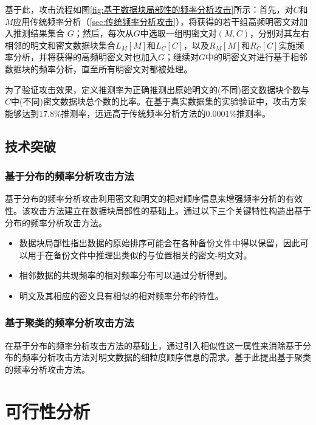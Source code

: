 基于此，攻击流程如图\ref{fig:基于数据块局部性的频率分析攻击}所示：首先，对$C$和$M$应用传统频率分析（\ref{sec:传统频率分析攻击}），将获得的若干组高频明密文对加入推测结果集合 $G$；然后，每次从$G$中选取一组明密文对$(M,C)$，分别对其左右相邻的明文和密文数据块集合$L_M[M]$和$L_C[C]$，以及$R_M[M]$和$R_C[C]$实施频率分析，并将获得的高频明密文对也加入$G$；继续对$G$中的明密文对进行基于相邻数据块的频率分析，直至所有明密文对都被处理。

为了验证攻击效果，定义推测率为正确推测出原始明文的(不同)密文数据块个数与$C$中(不同)密文数据块总个数的比率。在基于真实数据集的实验验证中，攻击方案能够达到17.8\%推测率，远远高于传统频率分析方法的0.0001\%推测率。


\subsection{技术突破}

\subsubsection{基于分布的频率分析攻击方法}


\par 基于分布的频率分析攻击利用密文和明文的相对顺序信息来增强频率分析的有效性。该攻击方法建立在数据块局部性的基础上。通过以下三个关键特性构造出基于分布的频率分析攻击方法。

\begin{itemize}
    \item 数据块局部性指出数据的原始排序可能会在各种备份文件中得以保留，因此可以用于在备份文件中推理出类似的与位置相关的密文-明文对。
    \item 相邻数据的共现频率的相对频率分布可以通过分析得到。
    \item 明文及其相应的密文具有相似的相对频率分布的特性。
\end{itemize}
 
\subsubsection{基于聚类的频率分析攻击方法}


在基于分布的频率分析攻击方法的基础上，通过引入相似性这一属性来消除基于分布的频率分析攻击方法对明文数据的细粒度顺序信息的需求。基于此提出基于聚类的频率分析攻击方法。

\section{可行性分析}

